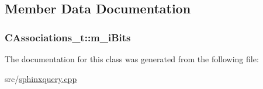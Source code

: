 \subsection{Member Data Documentation}
\hypertarget{classCAssociations__t_a9a9fb344c357a789ffba723385ee70db}{
\subsubsection[{m\-\_\-i\-Bits}]{ C\-Associations\-\_\-t\-::m\-\_\-i\-Bits\hspace{0.3cm}{\ttfamily [private]}}}\label{classCAssociations__t_a9a9fb344c357a789ffba723385ee70db}


The documentation for this class was generated from the following file\-:\begin{DoxyCompactItemize}
\item 
src/\hyperlink{sphinxquery_8cpp}{sphinxquery.\-cpp}\end{DoxyCompactItemize}
